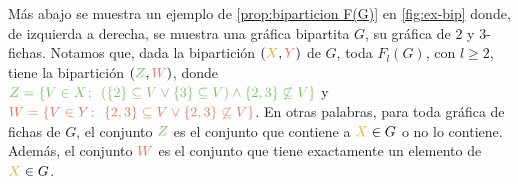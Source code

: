 M\'as abajo se muestra un ejemplo de \cref{prop:biparticion F(G)} en
\cref{fig:ex-bip} donde, de izquierda a derecha, se muestra una gr\'afica
bipartita $G$, su gr\'afica de $2$ y $3$-fichas. Notamos que, dada la
bipartici\'on $({\color{oro}X},{\color{salmon}Y})$ de $G$, toda $F_l(G)$, con
$l\geq 2$, tiene la bipartici\'on $({\color{verde}Z},{\color{salmon}W})$, donde
${\color{verde}Z=\{V\in X\colon\ (\{2\}\subseteq V  \lor \{3\} \subseteq V)
\land \{2,3\}\not\subseteq V\}}$ y ${\color{salmon}W=\{V \in Y\colon\
\{2,3\}\subseteq V \lor \{2,3\}\not\subseteq V\}}$. En otras palabras, para toda
gr\'afica de fichas de $G$, el conjunto ${\color{verde}Z}$ es el conjunto que
contiene a ${\color{oro}X}\in G$ o no lo contiene. Adem\'as, el conjunto
${\color{salmon}W}$ es el conjunto que tiene exactamente un elemento de
${\color{oro}X} \in G$.


